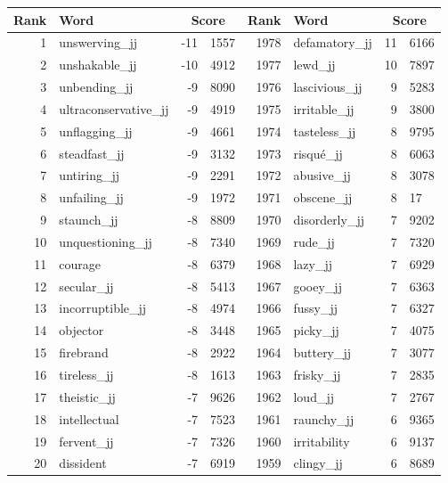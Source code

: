 \begin{table}[tbp]
    \begin{tabular}{| rlr@{.}l | rlr@{.}l |}
    \hline
    \textbf{Rank} & \textbf{Word} & \multicolumn{2}{c|}{\textbf{Score}} & \textbf{Rank} & \textbf{Word} & \multicolumn{2}{c|}{\textbf{Score}} \\
    \hline
    1 & unswerving\_jj & -11 & 1557    &    1978 & defamatory\_jj & 11 & 6166 \\
    2 & unshakable\_jj & -10 & 4912    &    1977 & lewd\_jj & 10 & 7897 \\
    3 & unbending\_jj & -9 & 8090    &    1976 & lascivious\_jj & 9 & 5283 \\
    4 & ultraconservative\_jj & -9 & 4919    &    1975 & irritable\_jj & 9 & 3800 \\
    5 & unflagging\_jj & -9 & 4661    &    1974 & tasteless\_jj & 8 & 9795 \\
    6 & steadfast\_jj & -9 & 3132    &    1973 & risqué\_jj & 8 & 6063 \\
    7 & untiring\_jj & -9 & 2291    &    1972 & abusive\_jj & 8 & 3078 \\
    8 & unfailing\_jj & -9 & 1972    &    1971 & obscene\_jj & 8 & 17 \\
    9 & staunch\_jj & -8 & 8809    &    1970 & disorderly\_jj & 7 & 9202 \\
    10 & unquestioning\_jj & -8 & 7340    &    1969 & rude\_jj & 7 & 7320 \\
    11 & courage & -8 & 6379    &    1968 & lazy\_jj & 7 & 6929 \\
    12 & secular\_jj & -8 & 5413    &    1967 & gooey\_jj & 7 & 6363 \\
    13 & incorruptible\_jj & -8 & 4974    &    1966 & fussy\_jj & 7 & 6327 \\
    14 & objector & -8 & 3448    &    1965 & picky\_jj & 7 & 4075 \\
    15 & firebrand & -8 & 2922    &    1964 & buttery\_jj & 7 & 3077 \\
    16 & tireless\_jj & -8 & 1613    &    1963 & frisky\_jj & 7 & 2835 \\
    17 & theistic\_jj & -7 & 9626    &    1962 & loud\_jj & 7 & 2767 \\
    18 & intellectual & -7 & 7523    &    1961 & raunchy\_jj & 6 & 9365 \\
    19 & fervent\_jj & -7 & 7326    &    1960 & irritability & 6 & 9137 \\
    20 & dissident & -7 & 6919    &    1959 & clingy\_jj & 6 & 8689 \\

\end{tabular}
\end{table}
